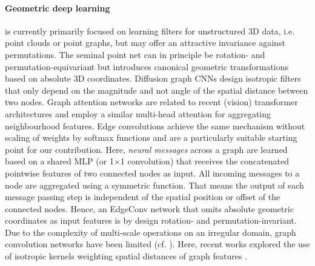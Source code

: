         \paragraph{Geometric deep learning} \citep{bronstein2017geometric} is currently primarily focused on learning filters for unstructured 3D data, i.e. point clouds or point graphs, but may offer an attractive invariance against permutations. The seminal point net \citep{qi2017pointnet} can in principle be rotation- and permutation-equivariant but introduces canonical geometric transformations based on absolute 3D coordinates. Diffusion graph CNNs \citep{atwood2016diffusion} design isotropic filters that only depend on the magnitude and not angle of the spatial distance between two nodes. Graph attention networks \citep{velivckovic2018graph} are related to recent (vision) transformer architectures and employ a similar multi-head attention for aggregating neighbourhood features. Edge convolutions \citep{wang2019dynamic} achieve the same mechanism without scaling of weights by softmax functions and are a particularly suitable starting point for our contribution. Here, \textit{neural messages} across a graph are learned based on a shared MLP (or 1$\times$1 convolution) that receives the concatenated pointwise features of two connected nodes as input. All incoming messages to a node are aggregated using a symmetric function.
        That means the output of each message passing step is independent of the spatial position or offset of the connected nodes. Hence, an EdgeConv network that omits absolute geometric coordinates as input features is by design rotation- and permutation-invariant.
        Due to the complexity of multi-scale operations on an irregular domain, graph convolution networks have been limited
        (cf. \citep{qi2017pointnet++}). Here, recent works explored the use of isotropic kernels weighting  spatial distances of graph features \citep{schutt2017schnet}.

